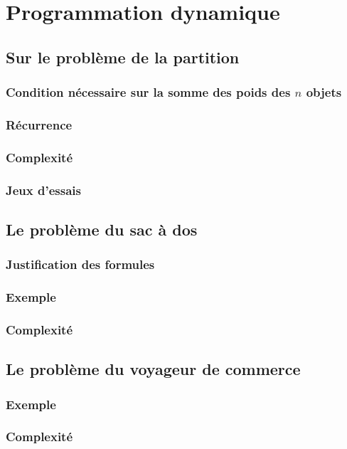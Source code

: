 
\section{Programmation dynamique}

\subsection{Sur le problème de la partition}
\subsubsection{Condition nécessaire sur la somme des poids des $n$ objets}

\subsubsection{Récurrence}

\subsubsection{Complexité}

\subsubsection{Jeux d'essais}


\subsection{Le problème du sac à dos}
\subsubsection{Justification des formules}

\subsubsection{Exemple}

\subsubsection{Complexité}


\subsection{Le problème du voyageur de commerce}
\subsubsection{Exemple}

\subsubsection{Complexité}
